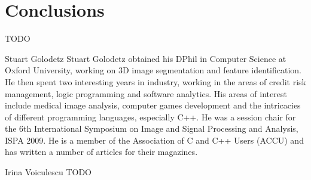 \documentclass[10pt,twocolumn,twoside]{IEEEtran}
\begin{document}
\section{Conclusions}
\label{sec:conclusions}

TODO

\clearpage




\begin{IEEEbiography}{Stuart Golodetz}
Stuart Golodetz obtained his DPhil in Computer Science at Oxford University, working on 3D image segmentation and feature identification. He then spent two interesting years in industry, working in the areas of credit risk management, logic programming and software analytics. His areas of interest include medical image analysis, computer games development and the intricacies of different programming languages, especially C++. He was a session chair for the 6th International Symposium on Image and Signal Processing and Analysis, ISPA 2009. He is a member of the Association of C and C++ Users (ACCU) and has written a number of articles for their magazines.
\end{IEEEbiography}

\begin{IEEEbiography}{Irina Voiculescu}
TODO
\end{IEEEbiography}
\end{document}
